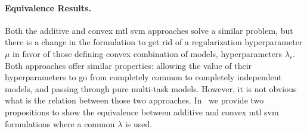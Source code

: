 \paragraph*{Equivalence Results.\\}
Both the {additive} and {convex} \acrshort{mtl} \acrshort{svm} approaches solve a similar problem, but there is a change in the formulation to get rid of a regularization hyperparameter $\mu$ in favor of those defining convex combination of models, hyperparameters $\lambda_r$.
Both approaches offer similar properties: allowing the value of their hyperparameters to go from completely common to completely independent models, and passing through pure multi-task models.
However, it is not obvious what is the relation between those two approaches.
In~\cite{RuizAD19} we provide two propositions to show the equivalence between {additive} and {convex} \acrshort{mtl} \acrshort{svm} formulations where a common $\lambda$ is used.
